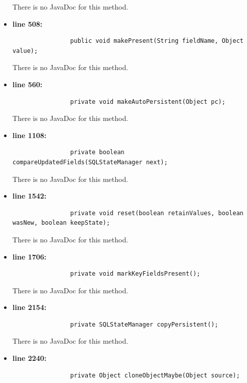 \documentclass[18pt,oneside,a4paper, titlepage]{article}
\begin{document}
\begin{itemize}
				There is no JavaDoc for this method.
				\item \textbf{line 508:} \begin{lstlisting}
				public void makePresent(String fieldName, Object value);
				\end{lstlisting}
				\vspace{0.1cm}
				
	
				There is no JavaDoc for this method.
				\item \textbf{line 560:} \begin{lstlisting}
				private void makeAutoPersistent(Object pc);
				\end{lstlisting}
				\vspace{0.1cm}
				
				There is no JavaDoc for this method.
				\item \textbf{line 1108:} \begin{lstlisting}
				private boolean compareUpdatedFields(SQLStateManager next);
				\end{lstlisting}
				\vspace{0.1cm}
				
				There is no JavaDoc for this method.
				\item \textbf{line 1542:} \begin{lstlisting}
				private void reset(boolean retainValues, boolean wasNew, boolean keepState);
				\end{lstlisting}
				\vspace{0.1cm}
				There is no JavaDoc for this method.
				\item \textbf{line 1706:} \begin{lstlisting}
				private void markKeyFieldsPresent();
				\end{lstlisting}
				\vspace{0.1cm}
				There is no JavaDoc for this method.
				\item \textbf{line 2154:} \begin{lstlisting}
				private SQLStateManager copyPersistent();
				\end{lstlisting}
				\vspace{0.1cm}
				
				There is no JavaDoc for this method.
				\item \textbf{line 2240:} \begin{lstlisting}
				private Object cloneObjectMaybe(Object source);
				\end{lstlisting}
				\vspace{0.1cm}
				

\end{itemize}
\end{document}

